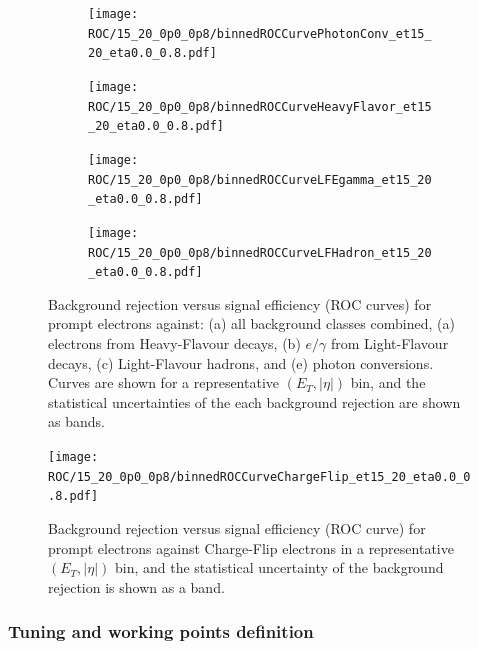 \begin{figure}[htbp]
  \centering
  \begin{subfigure}[t]{0.5\linewidth}
    \centering
    \texttt{[image: ROC/15\_20\_0p0\_0p8/binnedROCCurvePhotonConv\_et15\_20\_eta0.0\_0.8.pdf]}
    \caption{}
    \label{fig:roc_pc}
  \end{subfigure}\hfill
  \begin{subfigure}[t]{0.5\linewidth}
    \centering
    \texttt{[image: ROC/15\_20\_0p0\_0p8/binnedROCCurveHeavyFlavor\_et15\_20\_eta0.0\_0.8.pdf]}
    \caption{}
    \label{fig:roc_hf}
  \end{subfigure}

  \vspace{0.35cm}

  \begin{subfigure}[t]{0.5\linewidth}
    \centering
    \texttt{[image: ROC/15\_20\_0p0\_0p8/binnedROCCurveLFEgamma\_et15\_20\_eta0.0\_0.8.pdf]}
    \caption{}
    \label{fig:roc_lfeg}
  \end{subfigure}\hfill
  \begin{subfigure}[t]{0.5\linewidth}
    \centering
    \texttt{[image: ROC/15\_20\_0p0\_0p8/binnedROCCurveLFHadron\_et15\_20\_eta0.0\_0.8.pdf]}
    \caption{}
    \label{fig:roc_lfh}
  \end{subfigure}

  \caption{Background rejection versus signal efficiency (ROC curves) for prompt electrons against:
  (a) all background classes combined,
  (a) electrons from Heavy-Flavour decays,
  (b) $e/\gamma$ from Light-Flavour decays,
  (c) Light-Flavour hadrons,
  and (e) photon conversions.
  Curves are shown for a representative $(E_{T}, |\eta|)$ bin, and the statistical uncertainties of the each background rejection are shown as bands.}
  \label{fig:roc_mainbkg}
\end{figure}


\begin{figure}[htbp]
  \centering
  \texttt{[image: ROC/15\_20\_0p0\_0p8/binnedROCCurveChargeFlip\_et15\_20\_eta0.0\_0.8.pdf]}
  \caption{Background rejection versus signal efficiency (ROC curve) for prompt electrons against Charge-Flip electrons in a representative $(E_{T}, |\eta|)$ bin, and the statistical uncertainty of the background rejection is shown as a band.}
  \label{fig:roc_cf}
\end{figure}

\FloatBarrier
\subsubsection{Tuning and working points definition}
\label{dnn:tuning}

